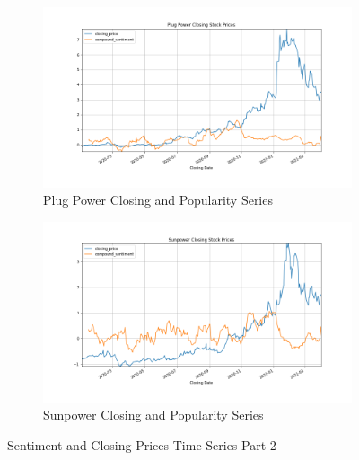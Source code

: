 \documentclass[sigconf, nonacm]{acmart}
\begin{document}
\begin{figure}[H]
\centering
   \begin{subfigure}[b]{0.5\textwidth}
   \includegraphics[width=\textwidth]{sentiment_time_series/Plug Power Closing Stock Prices_closing_price_compound_sentiment.png} 
   \caption{Plug Power Closing and Popularity Series}
   \label{fig:Ng1} 
\end{subfigure}
\centering
   \begin{subfigure}[b]{0.5\textwidth}
   \includegraphics[width=\textwidth]{sentiment_time_series/Sunpower Closing Stock Prices_closing_price_compound_sentiment.png} 
   \caption{Sunpower Closing and Popularity Series}
   \label{fig:Ng1} 
\end{subfigure}
\caption{Sentiment and Closing Prices Time Series Part 2}
\end{figure}





\end{document}
